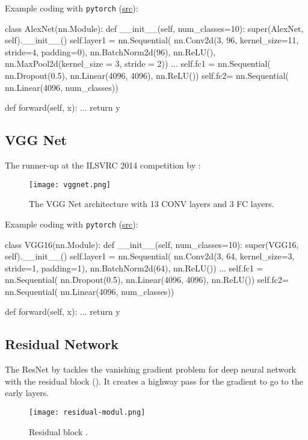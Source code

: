 Example coding with \texttt{pytorch} (\href{https://blog.paperspace.com/alexnet-pytorch/}{src}):
\begin{python}	
class AlexNet(nn.Module):
	def __init__(self, num_classes=10):
		super(AlexNet, self).__init__()
		self.layer1 = nn.Sequential(
		nn.Conv2d(3, 96, kernel_size=11, stride=4, padding=0),
		nn.BatchNorm2d(96),
		nn.ReLU(),
		nn.MaxPool2d(kernel_size = 3, stride = 2))
		...
		self.fc1 = nn.Sequential(
		nn.Dropout(0.5),
		nn.Linear(4096, 4096),
		nn.ReLU())
		self.fc2= nn.Sequential(
		nn.Linear(4096, num_classes))
	
	def forward(self, x):
		...
		return y
\end{python}

\subsection{VGG Net}
The runner-up at the ILSVRC 2014 competition by :

\begin{figure}[hbt!]
	\centering
	\texttt{[image: vggnet.png]}
	\caption{The VGG Net architecture with 13 \ac{CONV} layers and 3 \ac{FC} layers. \cite{simonyan2014very}}
\end{figure}

Example coding with \texttt{pytorch} (\href{https://blog.paperspace.com/vgg-from-scratch-pytorch/}{src}):
\begin{python}
	class VGG16(nn.Module):
	def __init__(self, num_classes=10):
	super(VGG16, self).__init__()
	self.layer1 = nn.Sequential(
	nn.Conv2d(3, 64, kernel_size=3, stride=1, padding=1),
	nn.BatchNorm2d(64),
	nn.ReLU())
	...
	self.fc1 = nn.Sequential(
	nn.Dropout(0.5),
	nn.Linear(4096, 4096),
	nn.ReLU())
	self.fc2= nn.Sequential(
	nn.Linear(4096, num_classes))
	
	def forward(self, x):
	...
	return y
\end{python}

\subsection{Residual Network}
The \ac{ResNet} by  tackles the vanishing gradient problem for deep neural network with the residual block (). It creates a highway pass for the gradient to go to the early layers.
\begin{figure}[hbt!]
	\centering
	\texttt{[image: residual-modul.png]}
	\caption{Residual block \cite{he2016deep}.}
	\label{fig:residual-modul}
\end{figure}

